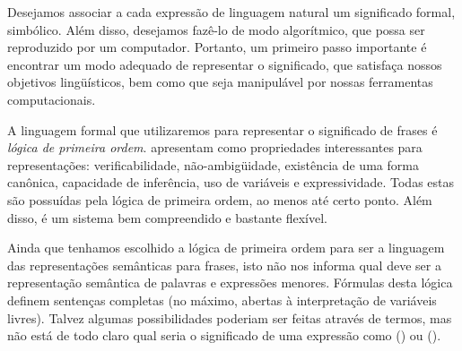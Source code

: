 


%
Desejamos associar a cada expressão de linguagem natural um significado formal, simbólico. Além disso, desejamos fazê-lo de modo algorítmico, que possa ser reproduzido por um computador. Portanto, um primeiro passo importante é encontrar um modo adequado de representar o significado, que satisfaça nossos objetivos lingüísticos, bem como que seja manipulável por nossas ferramentas computacionais.

A linguagem formal que utilizaremos para representar o significado de frases é \textit{lógica de primeira ordem}. \citet{Jurafsky:2009} apresentam como propriedades interessantes para representações: verificabilidade, não-ambigüidade, existência de uma forma canônica, capacidade de inferência, uso de variáveis e expressividade. Todas estas são possuídas pela lógica de primeira ordem, ao menos até certo ponto.  Além disso, é um sistema bem compreendido e bastante flexível.



Ainda que tenhamos escolhido a lógica de primeira ordem para ser a linguagem das representações semânticas para frases, isto não nos informa qual deve ser a representação semântica de palavras e expressões menores. Fórmulas desta lógica definem sentenças completas (no máximo, abertas à interpretação de variáveis livres). Talvez algumas possibilidades poderiam ser feitas através de termos, mas não está de todo claro qual seria o significado de uma expressão como  () ou  ().


